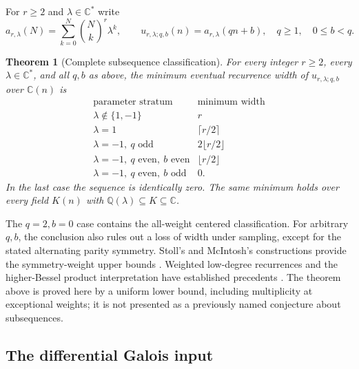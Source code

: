 \documentclass[11pt,a4paper]{article}
\newtheorem{theorem}{Theorem}[section]
\theoremstyle{definition}
\theoremstyle{remark}
\numberwithin{equation}{section}
\begin{document}
For $r\ge2$ and $\lambda\in\mathbb C^*$ write
\[
 a_{r,\lambda}(N)=\sum_{k=0}^N\binom Nk^r\lambda^k,
 \qquad u_{r,\lambda;q,b}(n)=a_{r,\lambda}(qn+b),
 \quad q\ge1,\quad 0\le b<q.
\]

\begin{theorem}[Complete subsequence classification]
\label{p8:ac:subsequence}
For every integer $r\ge2$, every $\lambda\in\mathbb C^*$, and all
$q,b$ as above, the minimum eventual recurrence width of
$u_{r,\lambda;q,b}$ over $\mathbb C(n)$ is
\[
\begin{array}{c|c}
\text{parameter stratum}&\text{minimum width}\\ \hline
\lambda\notin\{1,-1\}&r\\
\lambda=1&\lceil r/2\rceil\\
\lambda=-1,\ q\text{ odd}&2\lfloor r/2\rfloor\\
\lambda=-1,\ q\text{ even},\ b\text{ even}&\lfloor r/2\rfloor\\
\lambda=-1,\ q\text{ even},\ b\text{ odd}&0.
\end{array}
\]
In the last case the sequence is identically zero. The same minimum
holds over every field $K(n)$ with
$\mathbb Q(\lambda)\subseteq K\subseteq\mathbb C$.
\end{theorem}

The $q=2,b=0$ case contains the all-weight centered classification.
For arbitrary $q,b$, the conclusion also rules out a loss of width
under sampling, except for the stated alternating parity symmetry.
Stoll's and McIntosh's constructions provide the symmetry-weight
upper bounds \cite{p3:Stoll1997,p3:McIntosh1993}. Weighted low-degree
recurrences and the higher-Bessel product interpretation have
established precedents \cite{p3:MatalaAho1991,p7:AW_GRvS}. The theorem
above is proved here by a uniform lower bound, including multiplicity
at exceptional weights; it is not presented as a previously named
conjecture about subsequences.

\subsection{The differential Galois input}
\end{document}

